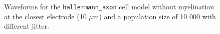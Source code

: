 \documentclass[final, a4paper,masters,en,listoffigures,listoftables,norwegiandates]{NMBU}
\begin{document}
\begin{figure}[htbp]
    \centering
    \vspace*{-3cm}
    \caption{Waveforms for the \texttt{hallermann\_axon} cell model without myelination at the closest electrode (10 $\mu$m) and a population size of 10 000 with different jitter.} 
    \label{fig:axonjitters}
\end{figure}
\end{document}
